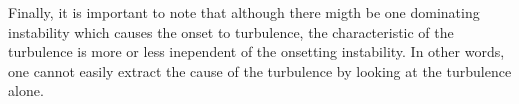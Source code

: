 Finally, it is important to note that although there migth be one dominating instability which causes the onset to turbulence, the characteristic of the turbulence is more or less inependent of the onsetting instability.
In other words, one cannot easily extract the cause of the turbulence by looking at the turbulence alone.
